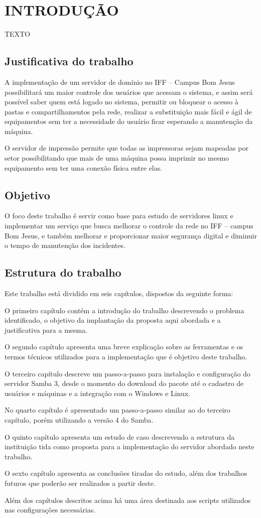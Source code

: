 \chapter{INTRODUÇÃO}

TEXTO

\section{Justificativa do trabalho}

A implementação de um servidor de domínio no IFF – Campus Bom Jesus possibilitará um maior controle dos usuários que acessam o sistema, e assim será possível saber quem está logado no sistema, permitir ou bloquear o acesso à pastas e compartilhamentos pela rede, realizar a substituição mais fácil e ágil de equipamentos sem ter a necessidade do usuário ficar esperando a manutenção da máquina.

O servidor de impressão permite que todas as impressoras sejam mapeadas por setor possibilitando que mais de uma máquina possa imprimir no mesmo equipamento sem ter uma conexão física entre elas.

\section{Objetivo}

O foco deste trabalho é servir como base para estudo de servidores linux e implementar um serviço que busca melhorar o controle da rede no IFF – campus Bom Jesus, e também melhorar e proporcionar maior segurança digital e diminuir o tempo de manutenção dos incidentes.

\section{Estrutura do trabalho}

Este trabalho está dividido em seis capítulos, dispostos da seguinte forma:

O primeiro capítulo contém a introdução do trabalho descrevendo o problema identificado, o objetivo da implantação da proposta aqui abordada e a justificativa para a mesma.

O segundo capítulo apresenta uma breve explicação sobre as ferramentas e os termos técnicos utilizados para a implementação que é objetivo deste trabalho. 

O terceiro capítulo descreve um passo-a-passo para instalação e configuração do servidor Samba 3, desde o momento do download do pacote até o cadastro de usuários e máquinas e a integração com o Windows e Linux.

No quarto capítulo é apresentado um passo-a-passo similar ao do terceiro capítulo, porém utilizando a versão 4 do Samba.

O quinto capítulo apresenta um estudo de caso descrevendo a estrutura da instituição tida como proposta para a implementação do servidor abordado neste trabalho.

O sexto capítulo apresenta as conclusões tiradas do estudo, além dos trabalhos futuros que poderão ser realizados a partir deste.

Além dos capítulos descritos acima há uma área destinada aos scripts utilizados nas configurações necessárias.